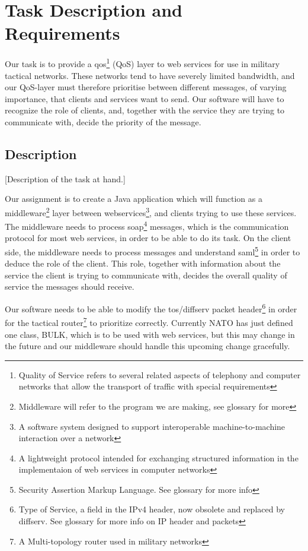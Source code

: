\section{Task Description and Requirements}\label{Task Description and Requirements} 

    Our task is to provide a \gls{qos}\footnote{Quality of Service refers to several related aspects of telephony and computer networks that allow the transport of traffic with special requirements} (QoS) layer to web services for use in military tactical networks. These networks tend to have severely limited bandwidth, and our QoS-layer must therefore prioritise between different messages, of varying importance, that clients and services want to send. Our software will have to recognize the role of clients, and, together with the service they are trying to communicate with, decide the priority of the message.
    
    
    \subsection{Description}\label{Description} 
    [Description of the task at hand.]
        
    Our assignment is to create a Java application which will function as a \gls{middleware}\footnote{Middleware will refer to the program we are making, see glossary for more} layer between \glspl{webservice}\footnote{A software system designed to support interoperable machine-to-machine interaction over a network}, and clients trying to use these services. The middleware needs to process \gls{soap}\footnote{A lightweight protocol intended for exchanging structured information in the implementaion of web services in computer networks} messages, which is the communication protocol for most web services, in order to be able to do its task. On the client side, the middleware needs to process messages and understand \gls{saml}\footnote{Security Assertion Markup Language. See glossary for more info} in order to deduce the role of the client. This role, together with information about the service the client is trying to communicate with, decides the overall quality of service the messages should receive. 

    Our software needs to be able to modify the \gls{tos}/\gls{diffserv} \gls{packet} header\footnote{Type of Service, a field in the IPv4 header, now obsolete and replaced by diffserv. See glossary for more info on IP header and packets} in order for the \gls{tactical router}\footnote{A Multi-topology router used in military networks} to prioritize correctly. Currently NATO has just defined one class, BULK, which is to be used with web services, but this may change in the future and our middleware should handle this upcoming change gracefully.

